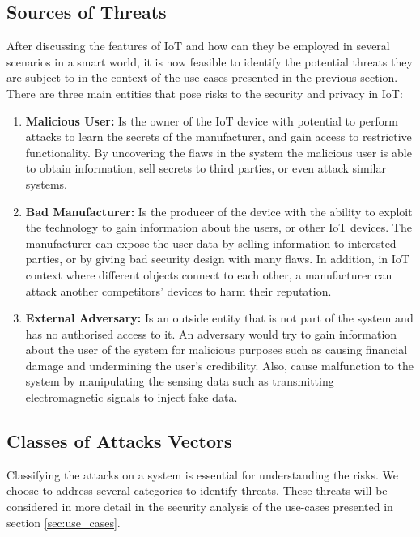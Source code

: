 \documentclass{llncs}
\begin{document}
\subsection{Sources of Threats}
After discussing the features of IoT and how can they be employed in several scenarios in a smart world, it is now feasible to identify the potential threats they are subject to in the context of the use cases presented in the previous section. 
There are three main entities that pose risks to the security and privacy in IoT:
\begin{enumerate}
\item \textbf{Malicious User:} Is the owner of the IoT device with potential to perform attacks to learn the secrets of the manufacturer, and gain access to restrictive functionality. By uncovering the flaws in the system the malicious user is able to obtain information, sell secrets to third parties, or even attack similar systems. 
\item \textbf{Bad Manufacturer:} Is the producer of the device with the ability to exploit the technology to gain information about the users, or other IoT devices. The manufacturer can expose the user data by selling information to interested parties, or by giving bad security design with many flaws. In addition, in IoT context where different objects connect to each other, a manufacturer can attack another competitors' devices to harm their reputation. 
\item \textbf{External Adversary:} Is an outside entity that is not part of the system and has no authorised access to it. An adversary would try to gain information about the user of the system for malicious purposes such as causing financial damage and undermining the user's credibility. Also, cause malfunction to the system by manipulating the sensing data such as transmitting electromagnetic signals to inject fake data.

\end{enumerate}

\subsection{Classes of Attacks Vectors}
Classifying the attacks on a system is essential for understanding the risks. We choose to address several categories to identify threats\cite{Myagmar2005}. These threats will be considered in more detail in the security analysis of the use-cases presented in section \ref{sec:use_cases}. 
\end{document}
